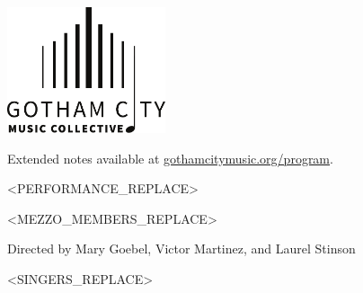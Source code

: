 \documentclass{article}[10pt]
\newcommand{\logo}{
        {\includegraphics[width=0.35\textwidth]{../graphic_design_assets/bw_logo_full}}
}
\newcommand{\tunespacefront}{\vspace{0.1in}}
\begin{document}
    \begin{center}

        \logo

        \vfill


        {{}}

        {
            \footnotesize{
                Extended notes available at
                \href{https://gothamcitymusic.org/program}{gothamcitymusic.org/program}.
            }
        }

        \tunespacefront
        \tunespacefront

        \begin{minipage}{\textwidth}
            \begin{flushright}

                <PERFORMANCE_REPLACE>

            \end{flushright}

        \end{minipage}

        \tunespacefront
        \tunespacefront

        \textbf{}
        \vspace{-0.15in}
        \begin{multicols}{3}
            \begin{small}
                <MEZZO_MEMBERS_REPLACE>
            \end{small}
        \end{multicols}

        \textbf{}

        \begin{small}
            Directed by
            Mary Goebel,
            Victor Martinez,
            and
            Laurel Stinson\\
        \end{small}

        \vspace{-0.1in}
        \begin{multicols}{3}
            \begin{center}
                \begin{small}
                    <SINGERS_REPLACE>
                \end{small}
            \end{center}
        \end{multicols}


\end{center}
\end{document}
